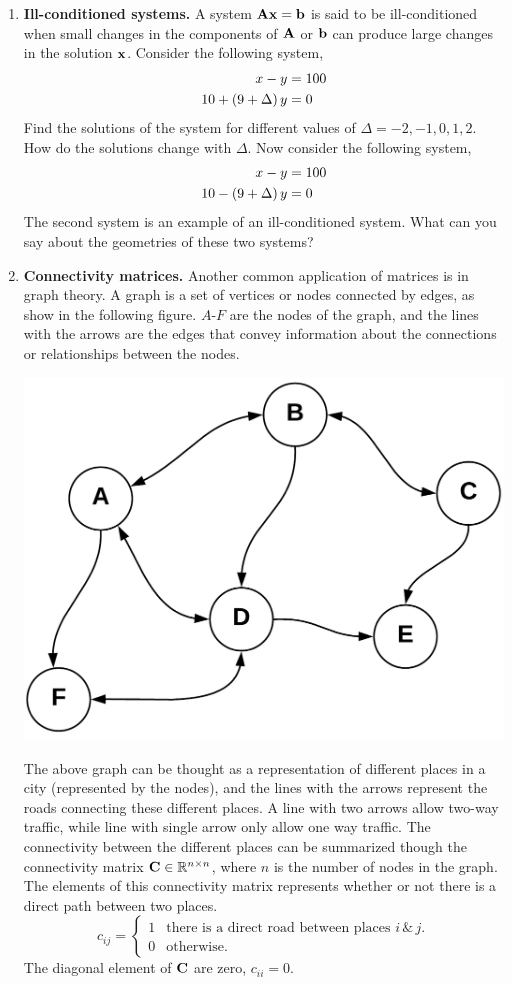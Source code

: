 \begin{enumerate}[resume]
    \item \label{matrices:uncertain} \textbf{Ill-conditioned systems.} A system $\mathbf{A}\mathbf{x} = \mathbf{b}$ is said to be ill-conditioned when small changes in the components of $\mathbf{A}$ or $\mathbf{b}$ can produce large changes in the solution $\mathbf{x}$. Consider the following system,
    \begin{align}
    x - y &= 100 \nonumber \\
    10 + \left( 9 + \Delta\right) y &= 0 \nonumber
    \end{align}
    Find the solutions of the system for different values of $\Delta = -2, -1, 0, 1, 2$. How do the solutions change with $\Delta$. Now consider the following system,
    \begin{align}
    x - y &= 100 \nonumber \\
    10 - \left( 9 + \Delta\right) y &= 0 \nonumber
    \end{align}
    The second system is an example of an ill-conditioned system. What can you say about the geometries of these two systems?

    \item \textbf{Connectivity matrices.} Another common application of matrices is in graph theory. A graph is a set of vertices or nodes connected by edges, as show in the following figure. $A$-$F$ are the nodes of the graph, and the lines with the arrows are the edges that convey information about the connections or relationships between the nodes.
    \begin{center}
        \includegraphics[width=0.5\columnwidth]{sections/figs/graph.png}
    \end{center}
    The above graph can be thought as a representation of different places in a city (represented by the nodes), and the lines with the arrows represent the roads connecting these different places. A line with two arrows allow two-way traffic, while line with single arrow only allow one way traffic. The connectivity between the different places can be summarized though the connectivity matrix $\mathbf{C} \in \mathbb{R}^{n \times n}$, where $n$ is the number of nodes in the graph. The elements of this connectivity matrix  represents whether or not there is a direct path between two places.
    \[ 
    c_{ij} = \begin{cases}
        1 & \text{there is a direct road between places } i \, \& \,j. \\
        0 & \text{otherwise.}
    \end{cases}
    \]
    The diagonal element of $\mathbf{C}$ are zero, $c_{ii} = 0$.


\end{enumerate}
